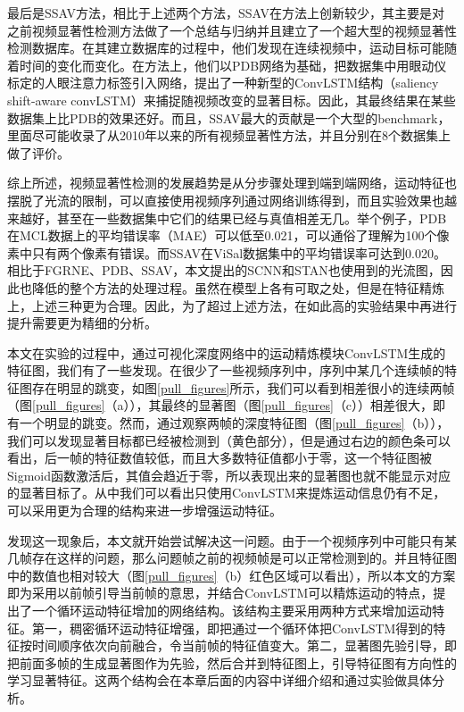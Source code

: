 最后是SSAV方法，相比于上述两个方法，SSAV在方法上创新较少，其主要是对之前视频显著性检测方法做了一个总结与归纳并且建立了一个超大型的视频显著性检测数据库。在其建立数据库的过程中，他们发现在连续视频中，运动目标可能随着时间的变化而变化。在方法上，他们以PDB网络为基础，把数据集中用眼动仪标定的人眼注意力标签引入网络，提出了一种新型的ConvLSTM结构（saliency shift-aware convLSTM）来捕捉随视频改变的显著目标。因此，其最终结果在某些数据集上比PDB的效果还好。而且，SSAV最大的贡献是一个大型的benchmark，里面尽可能收录了从2010年以来的所有视频显著性方法，并且分别在8个数据集上做了评价。

综上所述，视频显著性检测的发展趋势是从分步骤处理到端到端网络，运动特征也摆脱了光流的限制，可以直接使用视频序列通过网络训练得到，而且实验效果也越来越好，甚至在一些数据集中它们的结果已经与真值相差无几。举个例子，PDB在MCL数据上的平均错误率（MAE）可以低至0.021，可以通俗了理解为100个像素中只有两个像素有错误。而SSAV在ViSal数据集中的平均错误率可达到0.020。相比于FGRNE、PDB、SSAV，本文提出的SCNN和STAN也使用到的光流图，因此也降低的整个方法的处理过程。虽然在模型上各有可取之处，但是在特征精炼上，上述三种更为合理。因此，为了超过上述方法，在如此高的实验结果中再进行提升需要更为精细的分析。

本文在实验的过程中，通过可视化深度网络中的运动精炼模块ConvLSTM生成的特征图，我们有了一些发现。在很少了一些视频序列中，序列中某几个连续帧的特征图存在明显的跳变，如图\ref{pull_figures}所示，我们可以看到相差很小的连续两帧（图\ref{pull_figures}（a）），其最终的显著图（图\ref{pull_figures}（c））相差很大，即有一个明显的跳变。然而，通过观察两帧的深度特征图（图\ref{pull_figures}（b）），我们可以发现显著目标都已经被检测到（黄色部分），但是通过右边的颜色条可以看出，后一帧的特征数值较低，而且大多数特征值都小于零，这一个特征图被Sigmoid函数激活后，其值会趋近于零，所以表现出来的显著图也就不能显示对应的显著目标了。从中我们可以看出只使用ConvLSTM来提炼运动信息仍有不足，可以采用更为合理的结构来进一步增强运动特征。

发现这一现象后，本文就开始尝试解决这一问题。由于一个视频序列中可能只有某几帧存在这样的问题，那么问题帧之前的视频帧是可以正常检测到的。并且特征图中的数值也相对较大（图\ref{pull_figures}（b）红色区域可以看出），所以本文的方案即为采用以前帧引导当前帧的意思，并结合ConvLSTM可以精炼运动的特点，提出了一个循环运动特征增加的网络结构。该结构主要采用两种方式来增加运动特征。第一，稠密循环运动特征增强，即把通过一个循环体把ConvLSTM得到的特征按时间顺序依次向前融合，令当前帧的特征值变大。第二，显著图先验引导，即把前面多帧的生成显著图作为先验，然后合并到特征图上，引导特征图有方向性的学习显著特征。这两个结构会在本章后面的内容中详细介绍和通过实验做具体分析。

